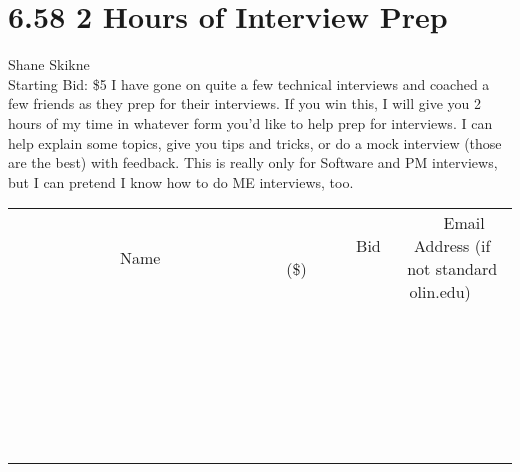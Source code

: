 \documentclass[11pt]{article}
\begin{document}
\section*{6.58 2 Hours of Interview Prep}
Shane Skikne
\\
Starting Bid: \$5
\newline
I have gone on quite a few technical interviews and coached a few friends as they prep for their interviews. If you win this, I will give you 2 hours of my time in whatever form you'd like to help prep for interviews. I can help explain some topics, give you tips and tricks, or do a mock interview (those are the best) with feedback. This is really only for Software and PM interviews, but I can pretend I know how to do ME interviews, too.
\\[6ex]
\begin{tabular}{c c c}
~~~~~~~~~~~~~Name~~~~~~~~~~~~~ & ~~~~~~~~~Bid (\$)~~~~~~~~~  & ~~~Email Address (if not standard olin.edu)~~~\\
 & & \\
\hline
 & & \\
\hline
 & & \\
\hline
 & & \\
\hline
 & & \\
\hline
 & & \\
\hline
 & & \\
\hline
 & & \\
\hline
 & & \\
\hline
 & & \\
\hline
 & & \\
\hline
 & & \\
\hline
 & & \\
\hline
 & & \\
\hline
 & & \\
\hline
 & & \\
\hline
 & & \\
\hline
 & & \\
\hline
 & & \\
\hline
 & & \\
\hline
 & & \\
\hline
 & & \\
\hline
 & & \\
\hline
 & & \\
\hline
 & & \\
\hline
 & & \\
\hline
\end{tabular}
\newpage
\end{document}
